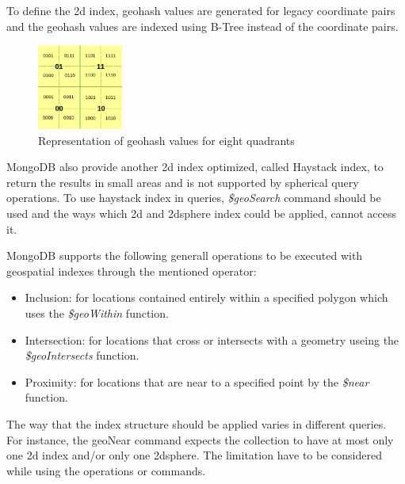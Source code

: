 \documentclass[a4paper,12pt]{article}
\begin{document}
To define the 2d index, geohash values are generated for legacy coordinate pairs and the geohash values are indexed using B-Tree instead of the coordinate pairs. 
\begin{figure}
\centering
\includegraphics[width=0.25\textwidth]{MongoIndex}
\caption{Representation of geohash values for eight quadrants}
\label{figmongoindex}
\end{figure}
MongoDB also provide another 2d index optimized, called Haystack index, to return the results in small areas and is not supported by spherical query operations. To use haystack index in queries, \textit{\$geoSearch} command should be used and the ways which 2d and 2dsphere index could be applied, cannot access it.

MongoDB supports the following generall operations to be executed with geospatial indexes through the mentioned operator:
\begin{itemize}
\item Inclusion: for locations contained entirely within a specified polygon which uses the \textit{\$geoWithin} function.
\item Intersection: for locations that cross or intersects with a geometry useing the
\textit{\$geoIntersects} function.
\item Proximity: for locations that are near to a specified point by the \textit{\$near}
function. 
\end{itemize}
The way that the index structure should be applied varies in different queries. For instance, the geoNear command expects the collection to have at most only one 2d index and/or only one 2dsphere. The limitation have to be considered while using the operations or commands. 
\end{document}
